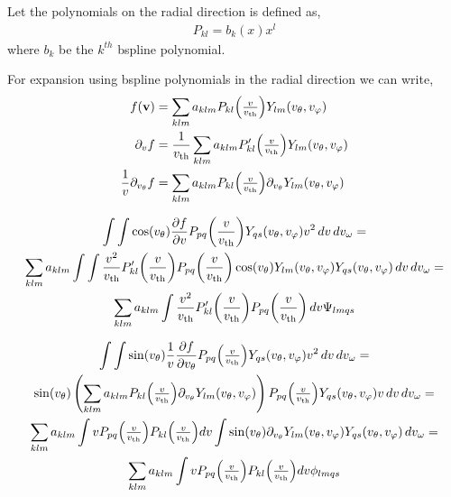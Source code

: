 \documentclass{article}
\begin{document}
Let the polynomials on the radial direction is defined as, 
\begin{align}
	P_{kl} = b_k(x) x^l
\end{align} where $b_k$ be the $k^{th}$ bspline polynomial. 

For expansion using bspline polynomials in the radial direction we can write, 
\begin{align}
f(\vect{v}) &= \sum_{klm} a_{klm} P_{kl}\of{\textstyle\frac{v}{\vth}} Y_{lm}\of{\vtheta,\vphi}\\
\partial_v f &= \frac{1}{\vth} \sum_{klm} a_{klm} P^\prime_{kl}\of{\textstyle\frac{v}{\vth}} Y_{lm}\of{\vtheta,\vphi}\\
\frac{1}{v}\partial_{v_\theta} f &= \sum_{klm} a_{klm} P_{kl}\of{\textstyle\frac{v}{\vth}} \partial_{v_\theta} Y_{lm}\of{\vtheta,\vphi}
\end{align}

\begin{multline}
\myint \myint \cos\of{\vtheta} \frac{\partial f}{\partial \vr} P_{pq}\of{\frac{\vr}{\vth}} Y_{qs}\of{\vtheta,\vphi} \vr^2 \diff{\vr} \diff{\vomega}= \\
\sum_{klm} a_{klm} \myint \myint \frac{v^2}{\vth}  P^\prime_{kl}\of{\frac{\vr}{\vth}} P_{pq}\of{\frac{\vr}{\vth}} \cos\of{\vtheta} Y_{lm}\of{\vtheta,\vphi} Y_{qs}\of{\vtheta,\vphi} \diff{v}\diff{v_\omega} =\\
\sum_{klm} a_{klm} \myint \frac{v^2}{\vth}  P^\prime_{kl}\of{\frac{\vr}{\vth}} P_{pq}\of{\frac{\vr}{\vth}} \diff{v} \Psi_{lmqs}
\end{multline}

\begin{multline*}
\myint \myint \sin\of{\vtheta} \frac{1}{\vr} \frac{\partial f}{\partial \vtheta} P_{pq}\of{\textstyle\frac{\vr}{\vth}} Y_{qs}\of{\vtheta,\vphi} \vr^2 \diff{\vr} \diff{\vomega} = \\
\sin\of{\vtheta}\left(\sum_{klm} a_{klm} P_{kl}\of{\textstyle\frac{v}{\vth}} \partial_{v_\theta} Y_{lm}\of{\vtheta,\vphi} \right) P_{pq}\of{\textstyle\frac{\vr}{\vth}} Y_{qs}\of{\vtheta,\vphi} \vr \diff{\vr} \diff{\vomega} = \\
\sum_{klm} a_{klm} \myint v P_{pq}\of{\textstyle\frac{v}{\vth}} P_{kl}\of{\textstyle\frac{v}{\vth}} dv \myint \sin\of{\vtheta} \partial_{v_\theta} Y_{lm}\of{\vtheta,\vphi}  Y_{qs}\of{\vtheta,\vphi} \diff{v_{\omega}} = \\
\sum_{klm} a_{klm} \myint v P_{pq}\of{\textstyle\frac{v}{\vth}} P_{kl}\of{\textstyle\frac{v}{\vth}} dv \phi_{lmqs}
\end{multline*}
\end{document}
